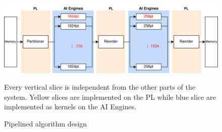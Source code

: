 \begin{figure}[h]
    \centering
    \includegraphics[width=1.0\textwidth]{images/prototype.png}
    \captionsetup{justification=centering}
    \caption{Pipelined algorithm design}
            Every vertical slice is independent from the other parts of the system. Yellow slices are implemented on the PL while blue slice are implemented as kernels on the AI Engines.
    \label{fig:pipelined}
\end{figure}

